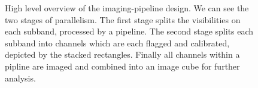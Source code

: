 \documentclass{aa}
\begin{document}
\begin{figure}[tbh]
\caption{\label{fig:pipeline}
High level overview of the imaging-pipeline design. We can see the two stages
of parallelism. The first stage splits the visibilities on each subband,
processed by a pipeline.  The second stage splits each subband into channels
which are each flagged and calibrated, depicted by the stacked rectangles.
Finally all channels within a pipline are imaged and combined into an image
cube for further analysis.}
\end{figure}

\end{document}
